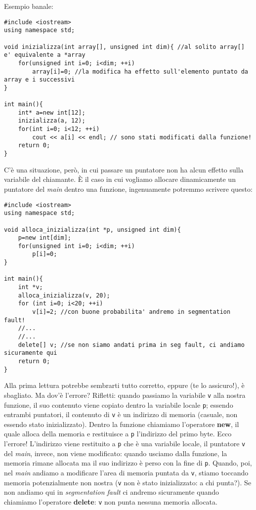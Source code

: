 Esempio banale:
\begin{lstlisting}
#include <iostream>
using namespace std;

void inizializza(int array[], unsigned int dim){ //al solito array[] e' equivalente a *array
	for(unsigned int i=0; i<dim; ++i)
		array[i]=0; //la modifica ha effetto sull'elemento puntato da array e i successivi
}

int main(){
	int* a=new int[12];
	inizializza(a, 12);
	for(int i=0; i<12; ++i)
		cout << a[i] << endl; // sono stati modificati dalla funzione!
	return 0;
}
\end{lstlisting}

C'è una situazione, però, in cui passare un puntatore non ha alcun effetto sulla variabile del chiamante.  È il caso in cui vogliamo allocare dinamicamente un puntatore del \emph{main} dentro una funzione, ingenuamente potremmo scrivere questo:
\begin{lstlisting}
#include <iostream>
using namespace std;

void alloca_inizializza(int *p, unsigned int dim){
	p=new int[dim];
	for(unsigned int i=0; i<dim; ++i)
		p[i]=0;
}

int main(){
	int *v;
	alloca_inizializza(v, 20);
	for (int i=0; i<20; ++i)
		v[i]=2; //con buone probabilita' andremo in segmentation fault!
	//...
	//...
	delete[] v; //se non siamo andati prima in seg fault, ci andiamo sicuramente qui
	return 0;
}
\end{lstlisting}

Alla prima lettura potrebbe sembrarti tutto corretto, eppure (te lo assicuro!), è sbagliato. Ma dov'è l'errore? Rifletti: quando passiamo la variabile \verb|v| alla nostra funzione, il suo contenuto viene copiato dentro la variabile locale \verb|p|; essendo entrambi puntatori, il contenuto di \verb|v| è un indirizzo di memoria (casuale, non essendo stato inizializzato).
Dentro la funzione chiamiamo l'operatore \textbf{new}, il quale alloca della memoria e restituisce a \verb|p| l'indirizzo del primo byte. Ecco l'errore! L'indirizzo viene restituito a \verb|p| che è una variabile locale, il puntatore \verb|v| del \emph{main}, invece, non viene modificato: quando usciamo dalla funzione, la memoria rimane allocata ma il suo indirizzo è perso con la fine di \verb|p|. Quando, poi, nel \emph{main} andiamo a modificare l'area di memoria puntata da \verb|v|, stiamo toccando memoria potenzialmente non nostra (\verb|v| non è stato inizializzato: a chi punta?). Se non andiamo qui in \emph{segmentation fault} ci andremo sicuramente quando chiamiamo l'operatore \textbf{delete}: \verb|v| non punta nessuna memoria allocata. 

